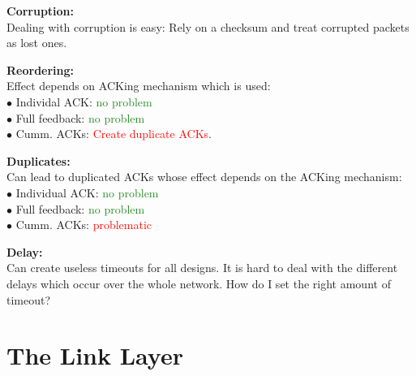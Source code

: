 \documentclass[a4paper, fontsize=8pt, landscape, DIV=1]{scrartcl}
\begin{document}
\begin{multicols*}{4}
   			\textbf{Corruption:}\\
   			Dealing with corruption is easy: Rely on a checksum and treat corrupted packets as lost ones. \par 
   			
   			\textbf{Reordering:}\\
   			Effect depends on ACKing mechanism which is used:\\
   			$\bullet$ Individal ACK: \textcolor{ForestGreen}{no problem}\\
   			$\bullet$ Full feedback: \textcolor{ForestGreen}{no problem}\\
   			$\bullet$ Cumm. ACKs: \textcolor{Red}{Create duplicate ACKs}.\par
   			
   			\textbf{Duplicates:}\\
   			Can lead to duplicated ACKs whose effect depends on the ACKing mechanism: \\
   			$\bullet$ Individual ACK: \textcolor{ForestGreen}{no problem}\\
   			$\bullet$ Full feedback: \textcolor{ForestGreen}{no problem}\\
   			$\bullet$ Cumm. ACKs: \textcolor{Red}{problematic}\par
   			
   			\textbf{Delay:}\\
   			Can create useless timeouts for all designs. It is hard to deal with the different delays which occur over the whole network. How do I set the right amount of timeout?\\
   			\newpage
   			
   			\section{The Link Layer}

\end{multicols*}
\end{document}
